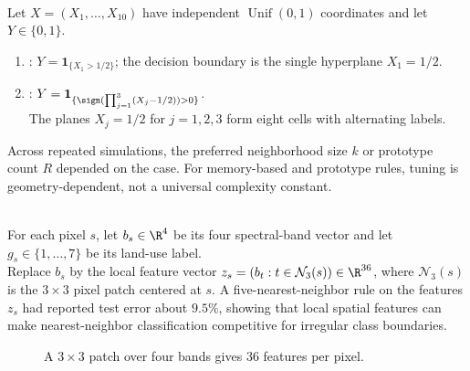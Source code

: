 \begin{example} \label{ex:sl-knn-prototype-comparative-study} \\
Let $X=(X_1,\ldots,X_{10})$ have independent $\operatorname{Unif}(0,1)$ coordinates and let $Y\in\{0,1\}$.
\begin{enumerate}[label=(\roman*)]
\setlength{\itemsep}{0pt}
\item {}: $Y=\mathbf{1}_{\{X_1>1/2\}}$; the decision boundary is the single hyperplane $X_1=1/2$.
\item {}: $Y=\mathbf{1}_{\{\sign(\prod_{j=1}^3(X_j-1/2))>0\}}$.\\
The planes $X_j=1/2$ for $j=1,2,3$ form eight cells with alternating labels.
\end{enumerate}
Across repeated simulations, the preferred neighborhood size $k$ or prototype count $R$ depended on the case.  For memory-based and prototype rules, tuning is geometry-dependent, not a universal complexity constant.
\end{example}

\begin{example} \label{ex:sl-image-scene-nearest-neighbor-classification} \\
For each pixel $s$, let $b_s\in\R^4$ be its four spectral-band vector and let $g_s\in\{1,\ldots,7\}$ be its land-use label.\\
Replace $b_s$ by the local feature vector $z_s=(b_t:t\in\mathcal{N}_3(s))\in\R^{36}$, where $\mathcal{N}_3(s)$ is the $3\times3$ pixel patch centered at $s$. A five-nearest-neighbor rule on the features $z_s$ had reported test error about $9.5\%$, showing that local spatial features can make nearest-neighbor classification competitive for irregular class boundaries.
\end{example}

\begin{figure}[H]
\centering

\caption{A $3\times3$ patch over four bands gives $36$ features per pixel.}
\label{fig:sl-pixel-eight-neighbor-feature-map}
\end{figure}


